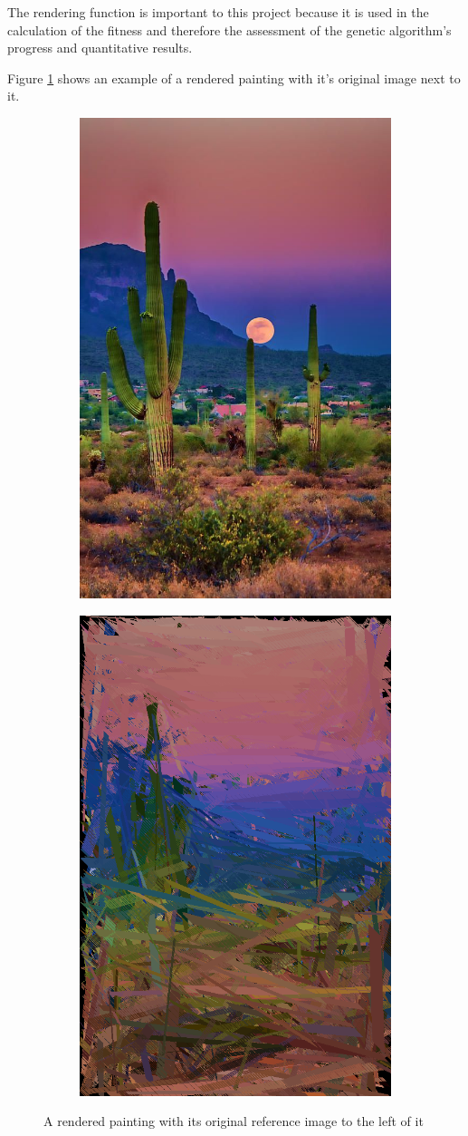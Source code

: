 The rendering function is important to this project because it is used in the calculation of the fitness and therefore the assessment of the genetic algorithm's progress and quantitative results.


Figure \ref{fig:refvsfinal} shows an example of a rendered painting with it's original image next to it. 
\begin{figure}
\begin{subfigure}[t]{.5\linewidth}
      \centering
      \includegraphics[width=0.4\linewidth]{reference.jpg}
  \end{subfigure}%
  \begin{subfigure}[t]{.5\linewidth}
      \centering
      \includegraphics[width=0.4\linewidth]{informed.png}
  \end{subfigure}
  \caption{A rendered painting with its original reference image to the left of it}
    \label{fig:refvsfinal}
\end{figure}


